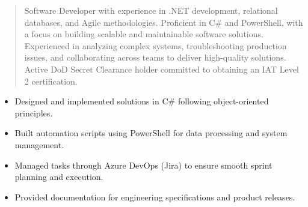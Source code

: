 



\makecvheader

\begin{quote}
  \noindent
  Software Developer with experience in .NET development, relational databases, and Agile methodologies. Proficient in C# and PowerShell, with a focus on building scalable and maintainable software solutions. Experienced in analyzing complex systems, troubleshooting production issues, and collaborating across teams to deliver high-quality solutions. Active DoD Secret Clearance holder committed to obtaining an IAT Level 2 certification.
\end{quote}

\par\smallskip
\noindent
\begin{minipage}{20cm}
  \begin{minipage}{9.75cm}
    \begin{itemize}
      \item Designed and implemented solutions in C# following object-oriented principles.
      \item Built automation scripts using PowerShell for data processing and system management.
    \end{itemize}
  \end{minipage}
  \hfill
  \begin{minipage}{9.75cm}
    \begin{itemize}
      \item Managed tasks through Azure DevOps (Jira) to ensure smooth sprint planning and execution.
      \item Provided documentation for engineering specifications and product releases.
    \end{itemize}
  \end{minipage}
\end{minipage}
\par\smallskip
\divider

